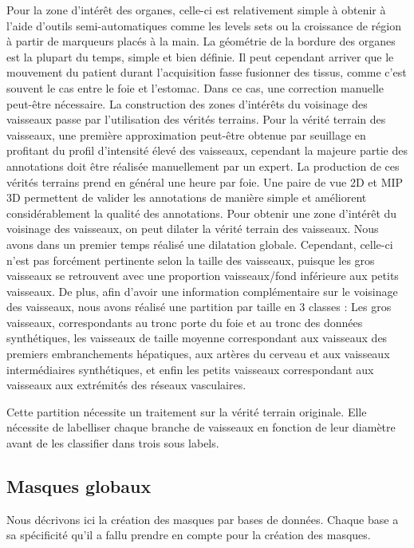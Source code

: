Pour la zone d'intérêt des organes, celle-ci est relativement simple à obtenir à l'aide d'outils semi-automatiques comme les levels sets ou la croissance de région à partir de marqueurs placés à la main. La géométrie de la bordure des organes est la plupart du temps, simple et bien définie. Il peut cependant arriver que le mouvement du patient durant l'acquisition fasse fusionner des tissus, comme c'est souvent le cas entre le foie et l'estomac. Dans ce cas, une correction manuelle peut-être nécessaire.
La construction des zones d'intérêts du voisinage des vaisseaux passe par l'utilisation des vérités terrains.
Pour la vérité terrain des vaisseaux, une première approximation peut-être obtenue par seuillage en profitant du profil d'intensité élevé des vaisseaux, cependant la majeure partie des annotations doit être réalisée manuellement par un expert. La production de ces vérités terrains prend en général une heure par foie. Une paire de vue 2D et MIP 3D permettent de valider les annotations de manière simple et améliorent considérablement la qualité des annotations.
Pour obtenir une zone d'intérêt du voisinage des vaisseaux, on peut dilater la vérité terrain des vaisseaux. Nous avons dans un premier temps réalisé une dilatation globale. Cependant, celle-ci n'est pas forcément pertinente selon la taille des vaisseaux, puisque les gros vaisseaux se retrouvent avec une proportion vaisseaux/fond inférieure aux petits vaisseaux. De plus, afin d'avoir une information complémentaire sur le voisinage des vaisseaux, nous avons réalisé une partition par taille en 3 classes : Les gros vaisseaux, correspondants au tronc porte du foie et au tronc des données synthétiques, les vaisseaux de taille moyenne correspondant aux vaisseaux des premiers embranchements hépatiques, aux artères du cerveau et aux vaisseaux intermédiaires synthétiques, et enfin les petits vaisseaux correspondant aux vaisseaux aux extrémités des réseaux vasculaires.

Cette partition nécessite un traitement sur la vérité terrain originale. Elle nécessite de labelliser chaque branche de vaisseaux en fonction de leur diamètre avant de les classifier dans trois sous labels.

\subsection{Masques globaux}

Nous décrivons ici la création des masques par bases de données. Chaque base a sa spécificité qu'il a fallu prendre en compte pour la création des masques.


